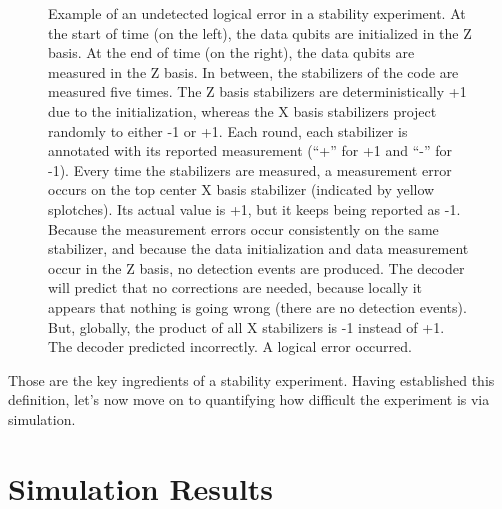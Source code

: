\documentclass[onecolumn,unpublished,a4paper]{quantumarticle}
\theoremstyle{definition}
\theoremstyle{definition}
\theoremstyle{definition}
\begin{document}
\begin{figure}
    \centering
    \caption{
        Example of an undetected logical error in a stability experiment.
        At the start of time (on the left), the data qubits are initialized in the Z basis.
        At the end of time (on the right), the data qubits are measured in the Z basis.
        In between, the stabilizers of the code are measured five times.
        The Z basis stabilizers are deterministically +1 due to the initialization, whereas the X basis stabilizers project randomly to either -1 or +1.
        Each round, each stabilizer is annotated with its reported measurement (``+'' for +1 and ``-'' for -1).
        Every time the stabilizers are measured, a measurement error occurs on the top center X basis stabilizer (indicated by yellow splotches).
        Its actual value is +1, but it keeps being reported as -1.
        Because the measurement errors occur consistently on the same stabilizer, and because the data initialization and data measurement occur in the Z basis, no detection events are produced.
        The decoder will predict that no corrections are needed, because locally it appears that nothing is going wrong (there are no detection events).
        But, globally, the product of all X stabilizers is -1 instead of +1.
        The decoder predicted incorrectly.
        A logical error occurred.
    }
    \label{fig:logical_error}
\end{figure}

Those are the key ingredients of a stability experiment.
Having established this definition, let's now move on to quantifying how difficult the experiment is via simulation.

\section{Simulation Results}
\end{document}
